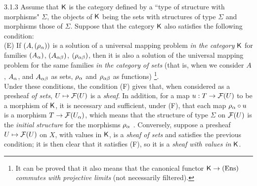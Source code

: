 \documentclass[../main.tex]{subfiles}
\begin{document}
\begin{env}{3.1.3}
Assume that $\mathsf{K}$ is the category defined by a ``type of structure
with morphisms" $\Sigma$, the objects of $\mathsf{K}$ being the sets with structures
of type $\Sigma$ and morphisms those of $\Sigma$. Suppose that the category $\mathsf{K}$ also satisfies
the following condition:\\

(E) If $(A,(\rho_\alpha))$ is a solution of a universal mapping problem \emph{in the category} $\mathsf{K}$
for families $(A_\alpha)$, $(A_{\alpha\beta})$, $(\rho_{\alpha\beta})$, then it is also a solution of the
universal mapping problem for the same families \emph{in the category of sets} (that is, when we
consider $A$, $A_\alpha$, and $A_{\alpha\beta}$ as sets, $\rho_\alpha$ and $\rho_{\alpha\beta}$ as functions)
\footnote{It can be proved that it also means that the canonical functor $\mathsf{K}\to(\mathrm{Ens})$
\emph{commutes with projective limits} (not necessarily filtered).}.\\

Under these conditions, the condition (F) gives that, when considered as a presheaf
\emph{of sets}, $U\mapsto\mathcal{F}(U)$ is a \emph{sheaf}. In addition, for a map $u:T\to\mathcal{F}(U)$
to be a morphism of $\mathsf{K}$, it is necessary and sufficient, under (F), that each map $\rho_\alpha\circ u$
is a morphism $T\to\mathcal{F}(U_\alpha)$, which means that the structure of type $\Sigma$ on $\mathcal{F}(U)$
is the \emph{initial structure} for the morphisms $\rho_\alpha$ . Conversely, suppose a presheaf
$U\mapsto\mathcal{F}(U)$ on $X$, with values in $\mathsf{K}$, is a \emph{sheaf of sets} and satisfies the previous
condition; it is then clear that it satisfies (F), so it is a \emph{sheaf with values in} $\mathsf{K}$.
\end{env}
\end{document}
